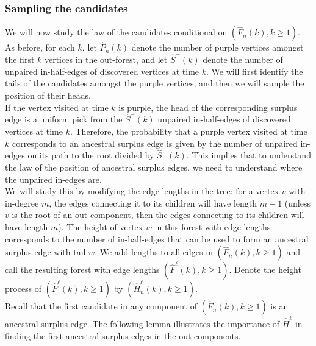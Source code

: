 \subsubsection{Sampling the candidates}\label{subsubsec.samplecandidates}
We will now study the law of the candidates conditional on $(\hat{F}_n(k),k\geq 1)$. As before, for each $k$, let $\hat{P}_n(k)$ denote the number of purple vertices amongst the first $k$ vertices in the out-forest, and let $\hat{S}^-(k)$ denote the number of unpaired in-half-edges of discovered vertices at time $k$. We will first identify the tails of the candidates amongst the purple vertices, and then we will sample the position of their heads. \\
If the vertex visited at time $k$ is purple, the head of the corresponding surplus edge is a uniform pick from the $\hat{S}^-(k)$ unpaired in-half-edges of discovered vertices at time $k$. Therefore, the probability that a purple vertex visited at time $k$ corresponds to an ancestral surplus edge is given by the number of unpaired in-edges on its path to the root divided by $\hat{S}^-(k)$. This implies that to understand the law of the position of ancestral surplus edges, we need to understand where the unpaired in-edges are. \\
We will study this by modifying the edge lengths in the tree: for a vertex $v$ with in-degree $m$, the edges connecting it to its children will have length $m-1$ (unless $v$ is the root of an out-component, then the edges connecting to its children will have length $m$). The height of vertex $w$ in this forest with edge lengths corresponds to the number of in-half-edges that can be used to form an ancestral surplus edge with tail $w$. We add lengths to all edges in $(\hat{F}_n(k),k\geq 1)$ and call the resulting forest with edge lengths $(\hat{F}^\ell(k),k\geq 1)$. Denote the height process of $(\hat{F}^\ell(k),k\geq 1)$ by $(\hat{H}_n^\ell(k),k\geq 1)$. \\
Recall that the first candidate in any component of $(\hat{F}_n(k),k\geq 1)$ is an ancestral surplus edge. The following lemma illustrates the importance of $\hat{H}^\ell$ in finding the first ancestral surplus edges in the out-components.


